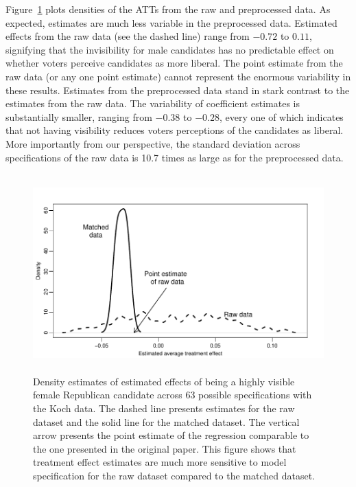 \documentclass[11pt,titlepage]{article}
\begin{document}
Figure~\ref{fg:kochdens} plots densities of the ATTs from the raw and
preprocessed data.  As expected, estimates are much less variable in
the preprocessed data.  Estimated effects from the raw data (see the
dashed line) range from $-0.72$ to $0.11$, signifying that the
invisibility for male candidates has no predictable effect on whether
voters perceive candidates as more liberal.  The point estimate from
the raw data (or any one point estimate) cannot represent the enormous
variability in these results.  Estimates from the preprocessed data
stand in stark contrast to the estimates from the raw data.  The
variability of coefficient estimates is substantially smaller, ranging
from $-0.38$ to $-0.28$, every one of which indicates that not having
visibility reduces voters perceptions of the candidates as liberal.
More importantly from our perspective, the standard deviation across
specifications of the raw data is 10.7 times as large as for the
preprocessed data.
\begin{figure}[t] 
 \begin{center}
   \includegraphics[height=3in,angle=0]{figs/kochdens.pdf}
 \end{center} 
 \vspace{-0.275in}
 \caption{Density estimates of estimated effects of
   being a highly visible female Republican candidate across 63
   possible specifications with the Koch data.  The dashed line
   presents estimates for the raw dataset and the solid line for the
   matched dataset.  The vertical arrow presents the point estimate of
   the regression comparable to the one presented in the original
   paper.  This figure shows that treatment effect estimates are much
   more sensitive to model specification for the raw dataset compared
   to the matched dataset.}
 \label{fg:kochdens}
\end{figure}
\end{document}
